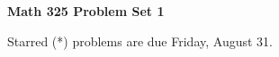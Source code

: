 \documentclass[12pt]{article}
\begin{document}
\def\ctln{\centerline}
\def\msk{\medskip}
\def\bsk{\bigskip}
\def\ssk{\smallskip}
\def\hsk{\hskip.3in}
\def\ra{\rightarrow}
\def\ubr{\underbar}

\def\mt{{\mathcal T}}
\def\mb{{\mathcal B}}
\def\ms{{\mathcal S}}
\def\mu{{\mathcal U}}
\def\mv{{\mathcal V}}

\def\bbr{{\mathbb R}}
\def\bbz{{\mathbb Z}}
\def\bbq{{\mathbb Q}}
\def\bbn{{\mathbb N}}
\def\spc{$~$\hskip.15in$~$}

\def\sset{\subseteq}
\def\del{\partial}
\def\lra{$\Leftrightarrow$}
\def\bra{$\Rightarrow$}




\ctln{\bf Math 325 Problem Set 1}

\msk

\ctln{Starred (*) problems are due Friday, August 31.}
\end{document}
